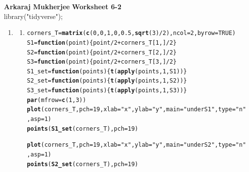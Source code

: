 \documentclass[12pt,a4paper]{article}\usepackage[]{graphicx}\usepackage[]{xcolor}
\makeatletter
\newcommand{\hlnum}[1]{\textcolor[rgb]{0.686,0.059,0.569}{#1}}%
\newcommand{\hlsng}[1]{\textcolor[rgb]{0.192,0.494,0.8}{#1}}%
\newcommand{\hlopt}[1]{\textcolor[rgb]{0,0,0}{#1}}%
\newcommand{\hldef}[1]{\textcolor[rgb]{0.345,0.345,0.345}{#1}}%
\newcommand{\hlkwa}[1]{\textcolor[rgb]{0.161,0.373,0.58}{\textbf{#1}}}%
\newcommand{\hlkwb}[1]{\textcolor[rgb]{0.69,0.353,0.396}{#1}}%
\newcommand{\hlkwc}[1]{\textcolor[rgb]{0.333,0.667,0.333}{#1}}%
\newcommand{\hlkwd}[1]{\textcolor[rgb]{0.737,0.353,0.396}{\textbf{#1}}}%
\newenvironment{kframe}{%
 \def\at@end@of@kframe{}%
 \ifinner\ifhmode%
  \def\at@end@of@kframe{\end{minipage}}%
  \begin{minipage}{\columnwidth}%
 \fi\fi%
 \def\FrameCommand##1{\hskip\@totalleftmargin \hskip-\fboxsep
 \colorbox{shadecolor}{##1}\hskip-\fboxsep
     \hskip-\linewidth \hskip-\@totalleftmargin \hskip\columnwidth}%
 \MakeFramed {\advance\hsize-\width
   \@totalleftmargin\z@ \linewidth\hsize
   \@setminipage}}%
 {\par\unskip\endMakeFramed%
 \at@end@of@kframe}
\newenvironment{knitrout}{}{} %
\makeatother
\begin{document}
{\bf Arkaraj Mukherjee}
{\bf Worksheet 6-2}
\\
library("tidyverse");
\begin{enumerate}[label=\arabic*.]
	\item
		\begin{enumerate}[label=(\alph*)]
			\item
			
\begin{knitrout}
\color{fgcolor}\begin{kframe}
\begin{alltt}
\hldef{corners_T} \hlkwb{=} \hlkwd{matrix}\hldef{(}\hlkwd{c}\hldef{(}\hlnum{0}\hldef{,}\hlnum{0}\hldef{,}\hlnum{1}\hldef{,}\hlnum{0}\hldef{,}\hlnum{0.5}\hldef{,}\hlkwd{sqrt}\hldef{(}\hlnum{3}\hldef{)}\hlopt{/}\hlnum{2}\hldef{),}\hlkwc{ncol} \hldef{=} \hlnum{2}\hldef{,} \hlkwc{byrow}\hldef{=}\hlnum{TRUE}\hldef{)}
\hldef{S1} \hlkwb{=} \hlkwa{function}\hldef{(} \hlkwc{point} \hldef{) \{point}\hlopt{/}\hlnum{2} \hlopt{+} \hldef{corners_T[}\hlnum{1}\hldef{,]}\hlopt{/}\hlnum{2}\hldef{\}}
\hldef{S2} \hlkwb{=} \hlkwa{function}\hldef{(} \hlkwc{point} \hldef{) \{point}\hlopt{/}\hlnum{2} \hlopt{+} \hldef{corners_T[}\hlnum{2}\hldef{,]}\hlopt{/}\hlnum{2}\hldef{\}}
\hldef{S3} \hlkwb{=} \hlkwa{function}\hldef{(} \hlkwc{point} \hldef{) \{point}\hlopt{/}\hlnum{2} \hlopt{+} \hldef{corners_T[}\hlnum{3}\hldef{,]}\hlopt{/}\hlnum{2}\hldef{\}}
\hldef{S1_set} \hlkwb{=} \hlkwa{function}\hldef{(}\hlkwc{points}\hldef{) \{}\hlkwd{t}\hldef{(}\hlkwd{apply}\hldef{(points,} \hlnum{1}\hldef{, S1))\}}
\hldef{S2_set} \hlkwb{=} \hlkwa{function}\hldef{(}\hlkwc{points}\hldef{) \{}\hlkwd{t}\hldef{(}\hlkwd{apply}\hldef{(points,} \hlnum{1}\hldef{, S2))\}}
\hldef{S3_set} \hlkwb{=} \hlkwa{function}\hldef{(}\hlkwc{points}\hldef{) \{}\hlkwd{t}\hldef{(}\hlkwd{apply}\hldef{(points,} \hlnum{1}\hldef{, S3))\}}
\hlkwd{par}\hldef{(}\hlkwc{mfrow} \hldef{=} \hlkwd{c}\hldef{(}\hlnum{1}\hldef{,}\hlnum{3}\hldef{))}
\hlkwd{plot}\hldef{(corners_T,} \hlkwc{pch} \hldef{=} \hlnum{19}\hldef{,} \hlkwc{xlab} \hldef{=} \hlsng{"x"}\hldef{,} \hlkwc{ylab} \hldef{=} \hlsng{"y"}\hldef{,} \hlkwc{main} \hldef{=} \hlsng{"under S1"}\hldef{,}\hlkwc{type} \hldef{=} \hlsng{"n"}\hldef{,}  \hlkwc{asp} \hldef{=} \hlnum{1}\hldef{)}
\hlkwd{points}\hldef{(}\hlkwd{S1_set}\hldef{(corners_T),} \hlkwc{pch} \hldef{=} \hlnum{19}\hldef{)}

\hlkwd{plot}\hldef{(corners_T,} \hlkwc{pch} \hldef{=} \hlnum{19}\hldef{,} \hlkwc{xlab} \hldef{=} \hlsng{"x"}\hldef{,} \hlkwc{ylab} \hldef{=} \hlsng{"y"}\hldef{,} \hlkwc{main} \hldef{=} \hlsng{"under S2"}\hldef{,} \hlkwc{type} \hldef{=} \hlsng{"n"}\hldef{,} \hlkwc{asp} \hldef{=} \hlnum{1}\hldef{)}
\hlkwd{points}\hldef{(}\hlkwd{S2_set}\hldef{(corners_T),} \hlkwc{pch} \hldef{=} \hlnum{19}\hldef{)}


\end{alltt}
\end{kframe}
\end{knitrout}
\end{enumerate}
\end{enumerate}
\end{document}
